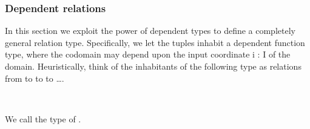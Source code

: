 \subsubsection{Dependent relations}\label{dependent-relations}

In this section we exploit the power of dependent types to define a completely general relation type. Specifically, we let the tuples inhabit a dependent function type, where the codomain may depend upon the input coordinate \ab i \as : \ab I of the domain. Heuristically, think of the inhabitants of the following type as relations from   to   to   to ….
\ccpad
\begin{code}%
\>[0]\AgdaSpace{}%
\AgdaSymbol{:}\AgdaSpace{}%
\AgdaSymbol{(}\AgdaSpace{}%
\AgdaSymbol{:}\AgdaSpace{}%
\AgdaSpace{}%
\AgdaSymbol{)(}\AgdaSpace{}%
\AgdaSymbol{:}\AgdaSpace{}%
\AgdaSpace{}%
\AgdaSpace{}%
\AgdaSpace{}%
\AgdaSymbol{)(}\AgdaSpace{}%
\AgdaSymbol{:}\AgdaSpace{}%
\AgdaSymbol{)}\AgdaSpace{}%
\AgdaSpace{}%
\AgdaSpace{}%
\AgdaSpace{}%
\AgdaSpace{}%
\AgdaSpace{}%
\AgdaSpace{}%
\AgdaSpace{}%
\<%
\\
\>[0]\AgdaSpace{}%
\AgdaSpace{}%
\AgdaSpace{}%
\AgdaSpace{}%
\AgdaSymbol{=}\AgdaSpace{}%
\AgdaSpace{}%
\AgdaSpace{}%
\AgdaSpace{}%
\AgdaSpace{}%
\<%
\end{code}
\ccpad
We call  the type of .


